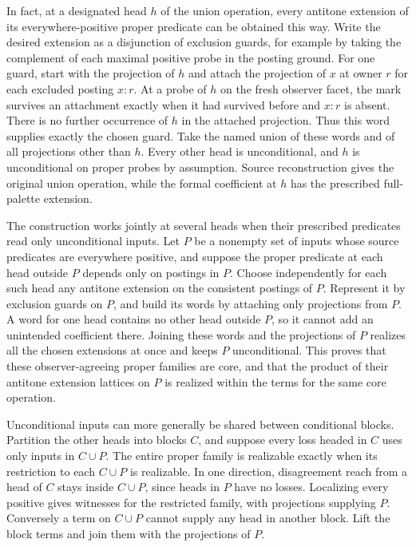 In fact, at a designated head $h$ of the
union operation, every antitone extension
of its everywhere-positive proper predicate
can be obtained this way. Write the desired
extension as a disjunction of exclusion
guards, for example by taking the complement
of each maximal positive probe in the
posting ground. For one guard, start with
the projection of $h$ and attach the
projection of $x$ at owner $r$ for each
excluded posting $x:r$. At a probe of
$h$ on the fresh observer facet, the
mark survives an attachment exactly when
it had survived before and $x:r$ is absent.
There is no further occurrence of $h$ in
the attached projection. Thus this word
supplies exactly the chosen guard. Take
the named union of these words and of all
projections other than $h$. Every other
head is unconditional, and $h$ is
unconditional on proper probes by
assumption. Source reconstruction gives
the original union operation, while the
formal coefficient at $h$ has the
prescribed full-palette extension.

The construction works jointly at several heads
when their prescribed predicates read only
unconditional inputs. Let $P$ be a nonempty set of inputs
whose source predicates are everywhere positive,
and suppose the proper predicate at each head
outside $P$ depends only on postings in $P$.
Choose independently for each such head any
antitone extension on the consistent postings
of $P$. Represent it by exclusion guards on
$P$, and build its words by attaching only
projections from $P$. A word for one head
contains no other head outside $P$, so it
cannot add an unintended coefficient there.
Joining these words and the projections of
$P$ realizes all the chosen extensions at
once and keeps $P$ unconditional. This proves
that these observer-agreeing proper families
are core, and that the product of their
antitone extension lattices on $P$ is realized
within the terms for the same core operation.

Unconditional inputs can more generally be shared
between conditional blocks. Partition the other
heads into blocks $C$, and suppose every loss
headed in $C$ uses only inputs in $C\cup P$.
The entire proper family is realizable exactly
when its restriction to each $C\cup P$ is
realizable. In one direction, disagreement
reach from a head of $C$ stays inside
$C\cup P$, since heads in $P$ have no losses.
Localizing every positive gives witnesses
for the restricted family, with projections
supplying $P$. Conversely a term on
$C\cup P$ cannot supply any head in
another block. Lift the block terms and
join them with the projections of $P$.

